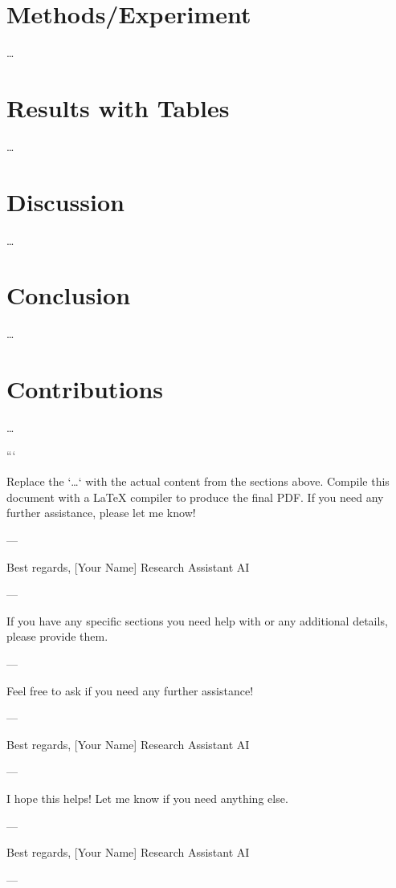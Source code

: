 \section{Methods/Experiment}
\label{sec:methods_experiment}
\ldots

\section{Results with Tables}
\label{sec:results_tables}
\ldots

\section{Discussion}
\label{sec:discussion}
\ldots

\section{Conclusion}
\label{sec:conclusion}
\ldots

\section{Contributions}
\label{sec:contributions}
\ldots





```

Replace the `\ldots` with the actual content from the sections above. Compile this document with a LaTeX compiler to produce the final PDF. If you need any further assistance, please let me know! 

---

Best regards,  
[Your Name]  
Research Assistant AI

--- 

If you have any specific sections you need help with or any additional details, please provide them. 

--- 

Feel free to ask if you need any further assistance! 

--- 

Best regards,  
[Your Name]  
Research Assistant AI

--- 

I hope this helps! Let me know if you need anything else. 

--- 

Best regards,  
[Your Name]  
Research Assistant AI

--- 

